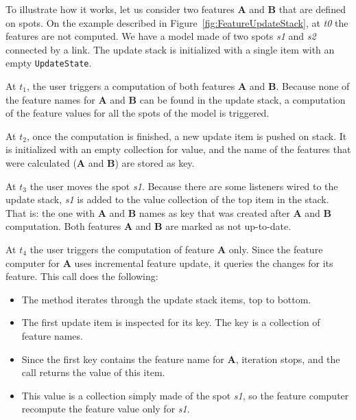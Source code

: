 To illustrate how it works, let us consider two features \textbf{A} and \textbf{B} that are defined on spots.
On the example described in Figure~\ref{fig:FeatureUpdateStack}, at \textit{t0} the features are not computed. 
We have a model made of two spots \textit{s1} and \textit{s2} connected by a link.
The update stack is initialized with a single item with an empty \texttt{UpdateState}.

At $t_1$, the user triggers a computation of both features \textbf{A} and \textbf{B}. 
Because none of the feature names for \textbf{A} and \textbf{B} can be found in the update stack, a computation of the feature values for all the spots of the model is triggered.

At $t_2$, once the computation is finished, a new update item is pushed on stack. 
It is initialized with an empty collection for value, and the name of the features that were calculated (\textbf{A} and \textbf{B}) are stored as key.

At $t_3$ the user moves the spot \textit{s1}. 
Because there are some listeners wired to the update stack, \textit{s1} is added to the value collection of the top item in the stack. 
That is: the one with \textbf{A} and \textbf{B} names as key that was created after \textbf{A} and \textbf{B} computation. 
Both features \textbf{A} and \textbf{B} are marked as not up-to-date.

At $t_4$ the user triggers the computation of feature \textbf{A} only. 
Since the feature computer for \textbf{A} uses incremental feature update, it queries the changes for its feature. 
This call does the following:

\begin{itemize}
    \item  The method iterates through the update stack items, top to bottom.
    
    \item The first update item is inspected for its key. 
    The key is a collection of feature names.
    
    \item Since the first key contains the feature name for \textbf{A}, iteration stops, and the call returns the value of this item.
    
    \item This value is a collection simply made of the spot \textit{s1}, so the feature computer recompute the feature value only for \textit{s1}.

\end{itemize}

